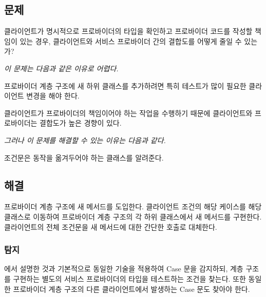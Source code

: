 \documentclass[a4paper,10pt,twoside]{book}
\begin{document}


\subsection*{문제}

클라이언트가 명시적으로 프로바이더의 타입을 확인하고 프로바이더 코드를 작성할 책임이 있는 경우, 클라이언트와 서비스 프로바이더 간의 결합도를 어떻게 줄일 수 있는가?

\emph{이 문제는 다음과 같은 이유로 어렵다.}

\begin{bulletlist}
\item 프로바이더 계층 구조에 새 하위 클래스를 추가하려면 특히 테스트가 많이 필요한 클라이언트 변경을 해야 한다.

\item 클라이언트가 프로바이더의 책임이어야 하는 작업을 수행하기 때문에 클라이언트와 프로바이더는 결합도가 높은 경향이 있다. 
\end{bulletlist}

\emph{그러나 이 문제를 해결할 수 있는 이유는 다음과 같다.}

\begin{bulletlist}
\item 조건문은 동작을 옮겨두어야 하는 클래스를 알려준다.
\end{bulletlist}

\subsection*{해결}

프로바이더 계층 구조에 새 메서드를 도입한다. 클라이언트 조건의 해당 케이스를 해당 클래스로 이동하여 프로바이더 계층 구조의 각 하위 클래스에서 새 메서드를 구현한다. 클라이언트의 전체 조건문을 새 메서드에 대한 간단한 호출로 대체한다.

\subsubsection*{탐지}

에서 설명한 것과 기본적으로 동일한 기술을 적용하여 Case 문을 감지하되, 계층 구조를 구현하는 별도의 서비스 프로바이더의 타입을 테스트하는 조건을 찾는다. 또한 동일한 프로바이더 계층 구조의 다른 클라이언트에서 발생하는 Case 문도 찾아야 한다.
\end{document}
